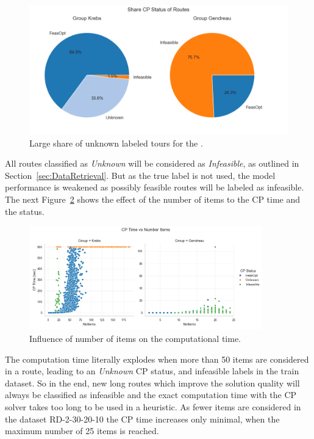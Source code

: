 \begin{figure}[ht]
	\centering
	\includegraphics[width=\textwidth]{pictures/comparison_krebs_gendreau/pie_chart_share_cp_status.png}
	\caption{Large share of unknown labeled tours for the \krebsADataSet.}
	\label{fig:comparison_krebs_gendreau_piechart}
\end{figure}
All routes classified as \textit{Unknown} will be considered as \textit{Infeasible}, as outlined in Section~\ref{sec:DataRetrieval}. But
as the true label is not used, the model performance is weakened as possibly feasible routes will be labeled as infeasible. The
next Figure~\ref{fig:comparison_krebs_gendreau_numberItems} shows the effect of the number of items to the \gls{CP} time and the status.

\begin{figure}[ht]
	\centering
	\includegraphics[width=0.9\textwidth]{pictures/comparison_krebs_gendreau/number_items_cp_status.png}
	\caption{Influence of number of items on the computational time.}
	\label{fig:comparison_krebs_gendreau_numberItems}
\end{figure}

The computation time literally explodes when more than 50 items are considered in a route, leading to an \textit{Unknown} \gls{CP} status, and
infeasible labels in the train dataset. So in the end, new long routes which improve the solution quality will always be classified as infeasible
and the exact computation time with the \gls{CP} solver takes too long to be used in a heuristic. As fewer items are considered in the dataset
RD-2-30-20-10 the \gls{CP} time increases only minimal, when the maximum number of 25 items is reached.

